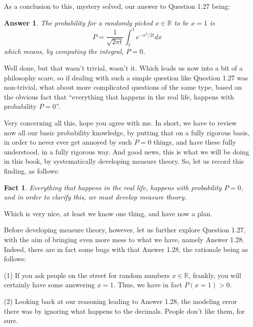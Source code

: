 \documentclass[12pt]{amsbook}
\newtheorem{answer}[theorem]{Answer}
\newtheorem{fact}[theorem]{Fact}
\begin{document}
\bigskip

As a conclusion to this, mystery solved, our answer to Question 1.27 being:


\begin{answer}
The probability for a randomly picked $x\in\mathbb R$ to be $x=1$ is
$$P=\frac{1}{\sqrt{2\pi t}}\int_1^1e^{-x^2/2t}dx$$
which means, by computing the integral, $P=0$.
\end{answer}

Well done, but that wasn't trivial, wasn't it. Which leads us now into a bit of a philosophy scare, so if dealing with such a simple question like Question 1.27 was non-trivial, what about more complicated questions of the same type, based on the obvious fact that ``everything that happens in the real life, happens with probability $P=0$''.

\bigskip

Very concerning all this, hope you agree with me. In short, we have to review now all our basic probability knowledge, by putting that on a fully rigorous basis, in order to never ever get annoyed by such $P=0$ things, and have these fully understood, in a fully rigorous way. And good news, this is what we will be doing in this book, by systematically developing measure theory. So, let us record this finding, as follows:

\begin{fact}
Everything that happens in the real life, happens with probability $P=0$, and in order to clarify this, we must develop measure theory.
\end{fact}

Which is very nice, at least we know one thing, and have now a plan.

\bigskip

Before developing measure theory, however, let us further explore Question 1.27, with the aim of bringing even more mess to what we have, namely Answer 1.28. Indeed, there are in fact some bugs with that Answer 1.28, the rationale being as follows:

\bigskip

(1) If you ask people on the street for random numbers $x\in\mathbb R$, frankly, you will certainly have some answering $x=1$. Thus, we have in fact $P(x=1)>0$.

\bigskip

(2) Looking back at our reasoning leading to Answer 1.28, the modeling error there was by ignoring what happens to the decimals. People don't like them, for sure.
\end{document}
